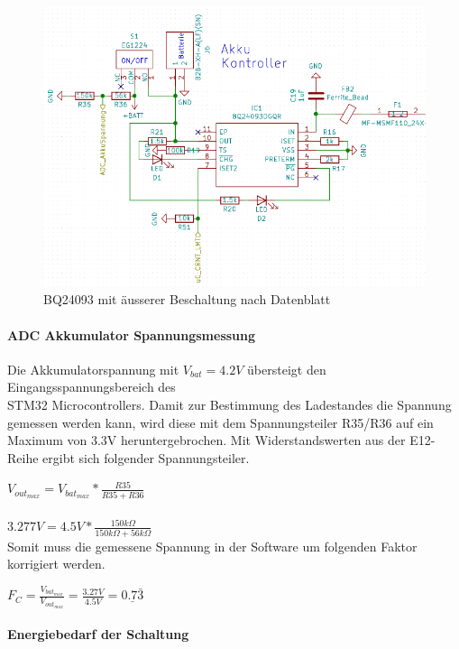 \begin{figure} [H]
\begin{center}
\includegraphics[scale=0.5]{../graphics/Schema_Akku.png}
\caption{BQ24093 mit äusserer Beschaltung nach Datenblatt}
\label{fig:Schema_Akku}
\end{center}
\end{figure}

\paragraph{ADC Akkumulator Spannungsmessung}

Die Akkumulatorspannung mit ${V_{bat}=4.2\si{V}}$ übersteigt den Eingangsspannungsbereich des\\
 STM32 Microcontrollers.
Damit zur Bestimmung des Ladestandes die Spannung gemessen werden kann, wird diese mit dem Spannungsteiler R35/R36 auf ein Maximum von 3.3\si{V} heruntergebrochen. 
Mit Widerstandswerten aus der E12-Reihe ergibt sich folgender Spannungsteiler.

${V_{out_{max}} = V_{bat_{max}}*\frac{R35}{R35+R36}}$\\
\\
${3.277\si{V} = 4.5\si{V}*\frac{150\si{k\Omega}}{150\si{k\Omega}+56\si{k\Omega}}}$\\

Somit muss die gemessene Spannung in der Software um folgenden Faktor korrigiert werden.

${F_C=\frac{V_{bat_{max}}}{V_{out_{max}}}=\frac{3.27\si{V}}{4.5\si{V}}=\underline{0.7\bar{3}}}$

\paragraph{Energiebedarf der Schaltung}

